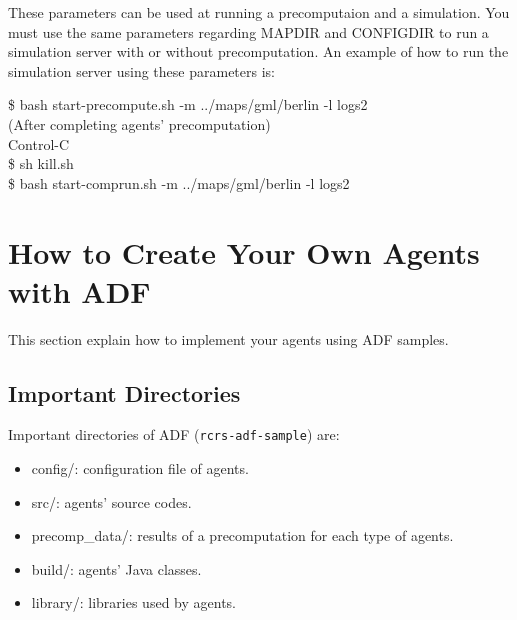 \documentclass[a4paper]{article}
\begin{document}
These parameters can be used at running a precomputaion and a simulation. You must use the same parameters regarding MAPDIR and CONFIGDIR to run a simulation server with or without precomputation. An example of how to run the simulation server using these parameters is:
\begin{center}
   \begin{tcolorbox}[title=Running Simulation Server with Options, width=.98\linewidth]
    {\ttfamily
    \$ bash start-precompute.sh -m ../maps/gml/berlin -l logs2\\
    (After completing agents' precomputation)\\
    Control-C\\
    \$ sh kill.sh\\
    \$ bash start-comprun.sh -m ../maps/gml/berlin -l logs2
    }
  \end{tcolorbox}
\end{center}
\section{How to Create Your Own Agents with ADF}
This section explain how to implement your agents using ADF samples.
\subsection{Important Directories}
Important directories of ADF (\texttt{rcrs-adf-sample}) are:
\begin{itemize}
 \item config/: configuration file of agents.
 \item src/: agents' source codes.
 \item precomp\_data/: results of a precomputation for each type of agents.
 \item build/: agents' Java classes.
 \item library/: libraries used by agents.
\end{itemize}

\end{document}

